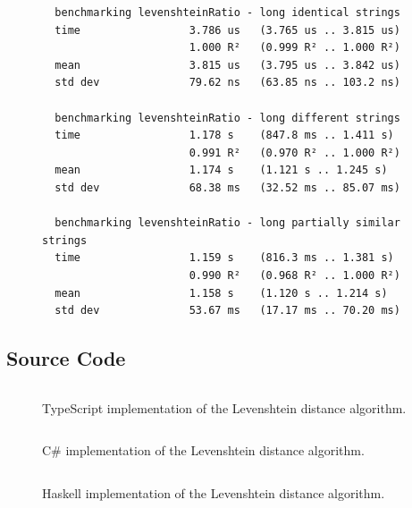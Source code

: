 \begin{landscape}
\begin{figure}[H]
\begin{verbatim}
  benchmarking levenshteinRatio - long identical strings
  time                 3.786 us   (3.765 us .. 3.815 us)
                       1.000 R²   (0.999 R² .. 1.000 R²)
  mean                 3.815 us   (3.795 us .. 3.842 us)
  std dev              79.62 ns   (63.85 ns .. 103.2 ns)

  benchmarking levenshteinRatio - long different strings
  time                 1.178 s    (847.8 ms .. 1.411 s)
                       0.991 R²   (0.970 R² .. 1.000 R²)
  mean                 1.174 s    (1.121 s .. 1.245 s)
  std dev              68.38 ms   (32.52 ms .. 85.07 ms)

  benchmarking levenshteinRatio - long partially similar strings
  time                 1.159 s    (816.3 ms .. 1.381 s)
                       0.990 R²   (0.968 R² .. 1.000 R²)
  mean                 1.158 s    (1.120 s .. 1.214 s)
  std dev              53.67 ms   (17.17 ms .. 70.20 ms)
  \end{verbatim}
\end{figure}
\hfill

\subsection*{Source Code}
\begin{figure}[H]
  \caption{TypeScript implementation of the Levenshtein distance algorithm.}
  \label{code:typescript}
  \inputminted[fontsize=\footnotesize]{typescript}{./doc/levenshteinRatio.ts}
\end{figure}

\hfill

\begin{figure}[H]
  \caption{C\# implementation of the Levenshtein distance algorithm.}
  \label{code:csharp}
  \inputminted[fontsize=\footnotesize]{csharp}{./doc/LevenshteinRatio.cs}
\end{figure}

\hfill

\begin{figure}[H]
  \caption{Haskell implementation of the Levenshtein distance algorithm.}
  \label{code:haskell}
  \inputminted[fontsize=\footnotesize]{haskell}{./doc/LevenshteinRatio.hs}
\end{figure}

\end{landscape}
